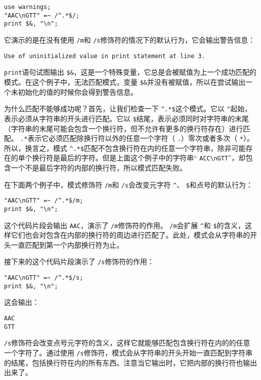 \begin{lstlisting}
use warnings;
"AAC\nGTT" =~ /^.*$/;
print $&, "\n";
\end{lstlisting}

它演示的是在没有使用 \verb|/m|和 \verb|/s|修饰符的情况下的默认行为，它会输出警告信息：

\begin{lstlisting}
Use of uninitialized value in print statement at line 3.
\end{lstlisting}

 \verb|print|语句试图输出 \verb|$&|，这是一个特殊变量，它总是会被赋值为上一个成功匹配的模式。在这个例子中，无法匹配模式，变量 \verb|$&|并没有被赋值，所以在尝试输出一个未初始化的值的时候你会得到警告信息。

为什么匹配不能够成功呢？首先，让我们检查一下 \verb|^.*$|这个模式。它以 \verb|^|起始，表示必须从字符串的开头进行匹配。它以 \verb|$|结尾，表示必须同时对字符串的末尾（字符串的末尾可能会包含一个换行符，但不允许有更多的换行符存在）进行匹配。 \verb|.*|表示它必须匹配除换行符以外的任意一个字符（ \verb|.|）零次或者多次（ \verb|*|）。所以，换言之，模式 \verb|^.*$|匹配不包含换行符在内的任意一个字符串，除非可能存在的单个换行符是最后的字符。但是上面这个例子中的字符串“ \verb|ACC\nGTT|”，却包含一个不是最后字符的内部的换行符，所以模式匹配失败。

在下面两个例子中，模式修饰符 \verb|/m|和 \verb|/s|会改变元字符 \verb|^|、 \verb|$|和点号的默认行为：

\begin{lstlisting}
"AAC\nGTT" =~ /^.*$/m;
print $&, "\n";
\end{lstlisting}

这个代码片段会输出 \verb|AAC|，演示了 \verb|/m|修饰符的作用。 \verb|/m|会扩展 \verb|^|和 \verb|$|的含义，这样它们也会对包含在内部的换行符的周边进行匹配了。此处，模式会从字符串的开头一直匹配到第一个内部换行符为止。

接下来的这个代码片段演示了 \verb|/s|修饰符的作用：

\begin{lstlisting}
"AAC\nGTT" =~ /^.*$/s;
print $&, "\n";
\end{lstlisting}

这会输出：

\begin{lstlisting}
AAC
GTT
\end{lstlisting}

 \verb|/s|修饰符会改变点号元字符的含义，这样它就能够匹配包含换行符在内的的任意一个字符了。通过使用 \verb|/s|修饰符，模式会从字符串的开头开始一直匹配到字符串的结尾，包括换行符在内的所有东西。注意当它输出时，它把内部的换行符也输出出来了。

